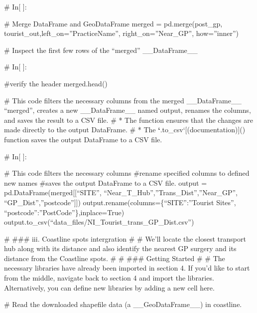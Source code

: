 \documentclass[letterpaper,10pt,english]{sphinxmanual}
\begin{document}
\sphinxAtStartPar
\# In{[} {]}:

\sphinxAtStartPar
\# Merge DataFrame and GeoDataFrame
merged = pd.merge(post\_gp, tourist\_out,left\_on=”PracticeName”, right\_on=”Near\_GP”, how=”inner”)

\sphinxAtStartPar
\# Inspect the first few rows of the “merged” \_\_DataFrame\_\_

\sphinxAtStartPar
\# In{[} {]}:

\sphinxAtStartPar
\#verify the header
merged.head()

\sphinxAtStartPar
\# This code filters the necessary columns from the merged \_\_DataFrame\_\_ “merged”, creates a new \_\_DataFrame\_\_ named output, renames the columns, and saves the result to a CSV file.
\# * The  function ensures that the changes are made directly to the output DataFrame.
\# * The {\color{red}\bfseries{}`}.to\_csv`{[}(documentation){]}() function saves the output DataFrame to a CSV file.

\sphinxAtStartPar
\# In{[} {]}:

\sphinxAtStartPar
\# This code filters the necessary columns
\#rename specified columns to defined new names
\#saves the output DataFrame to a CSV file.
output = pd.DataFrame(merged{[}{[}“SITE”, “Near\_T\_Hub”,”Trans\_Dist”,”Near\_GP”, “GP\_Dist”,”postcode”{]}{]})
output.rename(columns=\{“SITE”:”Tourist Sites”, “postcode”:”PostCode”\},inplace=True)
output.to\_csv(“data\_files/NI\_Tourist\_trans\_GP\_Dist.csv”)

\sphinxAtStartPar
\# \#\#\# iii. Coastline spots intergration
\#
\# We’ll locate the closest transport hub along with its distance and also identify the nearest GP surgery and its distance from the Coastline spots.
\#
\# \#\#\# Getting Started
\#
\# The necessary libraries have already been imported in section 4. If you’d like to start from the middle, navigate back to section 4 and import the libraries. Alternatively, you can define new libraries by adding a new cell here.

\sphinxAtStartPar
\# Read the downloaded shapefile data (a \_\_GeoDataFrame\_\_) in coastline.
\end{document}
